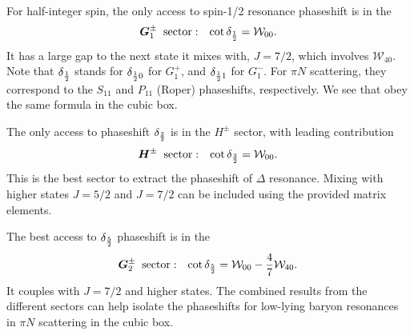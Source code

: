 \documentclass[aps,prd,reprint,showpacs,floatfix,longbibliography,,superscriptaddress]{revtex4-1}
\def\mw{\mathcal{W}}
\def\beq{\begin{equation}}
\def\eeq{\end{equation}}
\begin{document}
\begin{widetext}
For half-integer spin, the only access to spin-1/2 resonance phaseshift  is in the 
\beq
{\bm G^\pm_1 \;\;\text{sector}:}  \;\;\;  \cot\delta_{1\over 2} =  \mw_{00}.
\eeq
It has a large gap to the next state it mixes with, $J=7/2$, which involves $\mw_{40}$. 
Note that $\delta_{1\over 2}$ stands for $\delta_{{1\over 2}0}$  for  $G^+_1$,  and $\delta_{{1\over 2}1}$  for  $G^-_1$. 
For $\pi N$ scattering, they correspond to the $S_{11}$ and $P_{11}$ (Roper) phaseshifts, respectively. 
We see that obey the same formula in the cubic box.

The only access to phaseshift $\delta_{3\over 2}$ is in the $H^\pm$ sector, with leading contribution
\beq
{\bm H^\pm \;\;\text{sector}:}  \;\;\;  \cot\delta_{3\over 2} =  \mw_{00}.
\eeq
This is the best sector to extract the phaseshift of $\Delta$ resonance. 
Mixing with higher states $J=5/2$ and $J=7/2$ can be included using the provided matrix elements.


The best access to $\delta_{5\over 2}$ phaseshift is in the 
\beq
{\bm G^\pm_2 \;\;\text{sector}:}  \;\;\;  \cot\delta_{5\over 2} =   \mw_{00}-{4\over 7} \mw_{40}.
\eeq
It couples with $J=7/2$ and higher states.
The combined results from the different sectors can help isolate the phaseshifts for low-lying baryon resonances 
in $\pi N$ scattering in the cubic box.

%
\begin{table}
\end{table}
\end{widetext}
\end{document}
